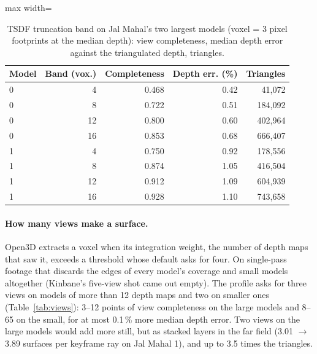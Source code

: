 \begin{table}[htbp]
\centering\small
\caption{TSDF truncation band on Jal Mahal's two largest models (voxel = 3 pixel footprints at the median depth): view completeness, median depth error against the triangulated depth, triangles.}\label{tab:tsdf}
\begin{adjustbox}{max width=\linewidth}
\begin{tabular}{lrrrr}
\toprule
Model & Band (vox.) & Completeness & Depth err. (\%) & Triangles \\
\midrule
0 & 4 & 0.468 & 0.42 & 41{,}072 \\
0 & 8 & 0.722 & 0.51 & 184{,}092 \\
0 & 12 & 0.800 & 0.60 & 402{,}964 \\
0 & 16 & 0.853 & 0.68 & 666{,}407 \\
1 & 4 & 0.750 & 0.92 & 178{,}556 \\
1 & 8 & 0.874 & 1.05 & 416{,}504 \\
1 & 12 & 0.912 & 1.09 & 604{,}939 \\
1 & 16 & 0.928 & 1.10 & 743{,}658 \\
\bottomrule
\end{tabular}
\end{adjustbox}
\end{table}

\paragraph{How many views make a surface.} Open3D extracts a voxel when its integration weight, the number of depth maps that saw it, exceeds a threshold whose default asks for four. On single-pass footage that discards the edges of every model's coverage and small models altogether (Kinbane's five-view shot came out empty). The profile asks for three views on models of more than 12 depth maps and two on smaller ones (Table~\ref{tab:views}): 3--12 points of view completeness on the large models and 8--65 on the small, for at most 0.1\,\% more median depth error. Two views on the large models would add more still, but as stacked layers in the far field (3.01 $\to$ 3.89 surfaces per keyframe ray on Jal Mahal 1), and up to 3.5 times the triangles.

